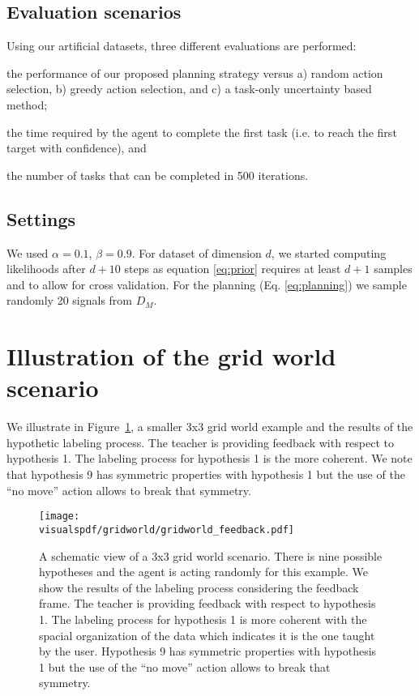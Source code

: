 \subsection{Evaluation scenarios}

Using our artificial datasets, three different evaluations are performed: \begin{inparaenum}[(i)] \item the performance of our proposed planning strategy versus a) random action selection, b) greedy action selection, and c) a task-only uncertainty based method; \item the time required by the agent to complete the first task (i.e. to reach the first target with confidence), and \item the number of tasks that can be completed in 500 iterations. \end{inparaenum}

\subsection{Settings}

We used $\alpha = 0.1$, $\beta = 0.9$. For dataset of dimension $d$, we started computing likelihoods after $d+10$ steps as equation \ref{eq:prior} requires at least $d+1$ samples and to allow for cross validation. For the planning (Eq. \ref{eq:planning}) we sample randomly 20 signals from $D_M$.

\section{Illustration of the grid world scenario}
\label{chapter:planning:gridworld}

We illustrate in Figure~\ref{fig:planning:gridworldfeedback}, a smaller 3x3 grid world example and the results of the hypothetic labeling process. The teacher is providing feedback with respect to hypothesis 1. The labeling process for hypothesis 1 is the more coherent. We note that hypothesis 9 has symmetric properties with hypothesis 1 but the use of the ``no move'' action allows to break that symmetry.

\begin{figure}[!htbp]
  \centering
  \texttt{[image: \\visualspdf/gridworld/gridworld\_feedback.pdf]}
  \caption{A schematic view of a 3x3 grid world scenario. There is nine possible hypotheses and the agent is acting randomly for this example. We show the results of the labeling process considering the feedback frame. The teacher is providing feedback with respect to hypothesis 1. The labeling process for hypothesis 1 is more coherent with the spacial organization of the data which indicates it is the one taught by the user. Hypothesis 9 has symmetric properties with hypothesis 1 but the use of the ``no move'' action allows to break that symmetry.}
  \label{fig:planning:gridworldfeedback}
\end{figure}

